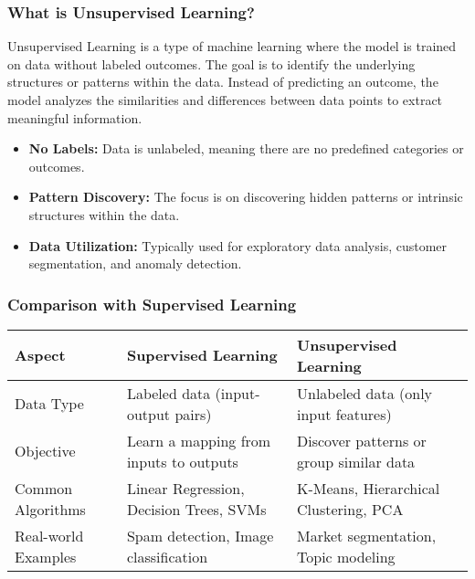 \documentclass[aspectratio=169]{beamer}
\begin{document}
\begin{frame}[fragile]
    \frametitle{What is Unsupervised Learning?}
    Unsupervised Learning is a type of machine learning where the model is trained on data without labeled outcomes. The goal is to identify the underlying structures or patterns within the data. Instead of predicting an outcome, the model analyzes the similarities and differences between data points to extract meaningful information.

    \begin{itemize}
        \item \textbf{No Labels:} Data is unlabeled, meaning there are no predefined categories or outcomes.
        \item \textbf{Pattern Discovery:} The focus is on discovering hidden patterns or intrinsic structures within the data.
        \item \textbf{Data Utilization:} Typically used for exploratory data analysis, customer segmentation, and anomaly detection.
    \end{itemize}
\end{frame}

\begin{frame}[fragile]
    \frametitle{Comparison with Supervised Learning}
    \begin{table}[ht]
        \centering
        \begin{tabular}{@{}lll@{}}
            \toprule
            \textbf{Aspect} & \textbf{Supervised Learning} & \textbf{Unsupervised Learning} \\ \midrule
            Data Type & Labeled data (input-output pairs) & Unlabeled data (only input features) \\
            Objective & Learn a mapping from inputs to outputs & Discover patterns or group similar data \\
            Common Algorithms & Linear Regression, Decision Trees, SVMs & K-Means, Hierarchical Clustering, PCA \\
            Real-world Examples & Spam detection, Image classification & Market segmentation, Topic modeling \\ \bottomrule
        \end{tabular}
    \end{table}
\end{frame}
\end{document}
